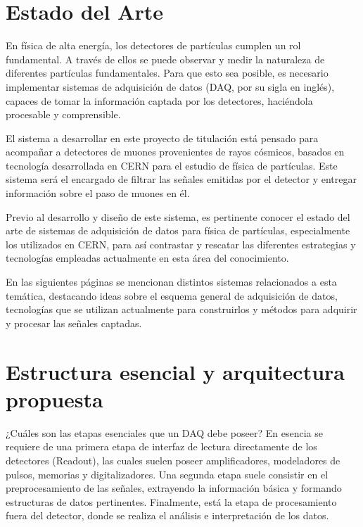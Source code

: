 \section{Estado del Arte}
	\par En física de alta energía, los detectores de partículas cumplen un rol fundamental. A través de ellos se puede observar y medir la naturaleza de diferentes partículas fundamentales. Para que esto sea posible, es necesario implementar sistemas de adquisición de datos (DAQ, por su sigla en inglés), capaces de tomar la información captada por los detectores, haciéndola procesable y comprensible.
	\par El sistema a desarrollar en este proyecto de titulación está pensado para acompañar a detectores de muones provenientes de rayos cósmicos, basados en tecnología desarrollada en CERN para el estudio de física de partículas. Este sistema será el encargado de filtrar las señales emitidas por el detector y entregar información sobre el paso de muones en él.
	\par Previo al desarrollo y diseño de este sistema, es pertinente conocer el estado del arte de sistemas de adquisición de datos para física de partículas, especialmente los utilizados en CERN, para así contrastar y rescatar las diferentes estrategias y tecnologías empleadas actualmente en esta área del conocimiento.
	\par En las siguientes páginas se mencionan distintos sistemas relacionados a esta temática, destacando ideas sobre el esquema general de adquisición de datos, tecnologías que se utilizan actualmente para construirlos y  métodos para adquirir y procesar las señales captadas.
	
	\section{Estructura esencial y arquitectura propuesta}
	\par ¿Cuáles son las etapas esenciales que un DAQ debe poseer? En esencia se requiere de una primera etapa de interfaz de lectura directamente de los detectores (Readout), las cuales suelen poseer amplificadores, modeladores de pulsos, memorias y digitalizadores. Una segunda etapa suele consistir en el preprocesamiento de las señales, extrayendo la información básica y formando estructuras de datos pertinentes. Finalmente, está la etapa de procesamiento fuera del detector, donde se realiza el análisis e interpretación de los datos.
	
